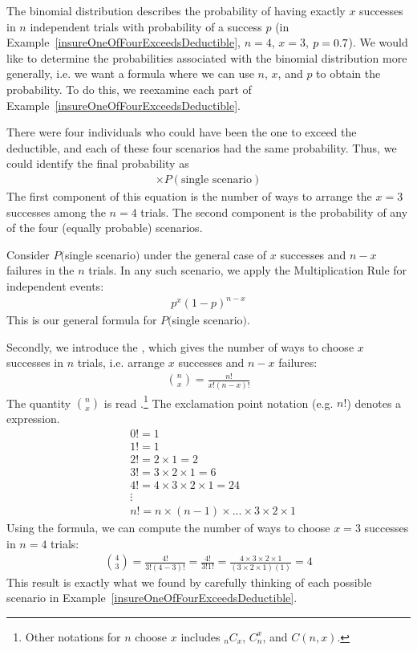The binomial distribution describes the probability of having exactly $x$ successes
in $n$ independent trials with probability
of a success $p$
(in Example~\ref{insureOneOfFourExceedsDeductible},
$n=4$, $x=3$, $p=0.7{}$).
We would like to determine the probabilities associated
with the binomial distribution more generally,
i.e. we want a formula where we can use $n$, $x$, and $p$
to obtain the probability.
To do this, we reexamine each part of
Example~\ref{insureOneOfFourExceedsDeductible}.

There were four individuals who could have been the one
to exceed the deductible, and each of these four scenarios
had the same probability.
Thus, we could identify the final probability as
\begin{align*}
[\text{\# of scenarios}] \times P(\text{single scenario})
\end{align*}
The first component of this equation is the number of ways
to arrange the $x=3$ successes among the $n=4$ trials.
The second component is the probability of any of the four
(equally probable) scenarios.

Consider $P($single scenario$)$ under the general case of
$x$ successes and $n-x$ failures in the $n$ trials.
In any such scenario, we apply the Multiplication Rule
for independent events:
\begin{align*}
p^x (1 - p)^{n - x}
\end{align*}
This is our general formula for $P($single scenario$)$.

Secondly, we introduce the , which gives the number
of ways to choose $x$ successes in $n$ trials,
i.e. arrange $x$ successes and $n - x$ failures:
\begin{align*}
{n\choose x} = \frac{n!}{x! (n - x)!}
\end{align*}
The quantity ${n\choose x}$ is read
.\footnote{Other notations for
  $n$ choose $x$ includes $_nC_x$, $C_n^x$, and $C(n,x)$.}
The exclamation point notation (e.g. $n!$) denotes
a  expression.
\begin{align*}
& 0! = 1 \\
& 1! = 1 \\
& 2! = 2\times1 = 2 \\
& 3! = 3\times2\times1 = 6 \\
& 4! = 4\times3\times2\times1 = 24 \\
& \vdots \\
& n! = n\times(n-1)\times...\times3\times2\times1
\end{align*}
Using the formula, we can compute the number of ways
to choose $x = 3$ successes in $n = 4$ trials:
\begin{align*}
{4 \choose 3} = \frac{4!}{3!(4-3)!}
  = \frac{4!}{3!1!} 
  = \frac{4\times3\times2\times1}{(3\times2\times1) (1)}
  = 4
\end{align*}
This result is exactly what we found by carefully thinking
of each possible scenario in
Example~\ref{insureOneOfFourExceedsDeductible}.

